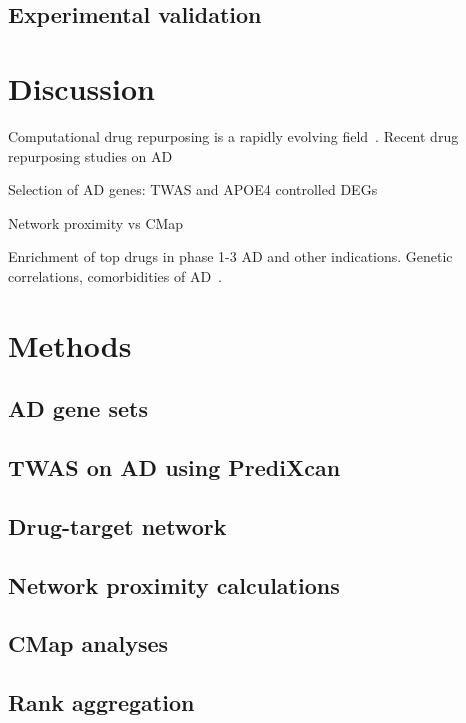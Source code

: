 \documentclass[letterpaper]{article}
\begin{document}
\subsection{Experimental validation}

\section{Discussion}

Computational drug repurposing is a rapidly evolving
field~\citep{Pushpakom2019}.  Recent drug repurposing studies on
AD~\citep{Taubes2021,Fang2021}

Selection of AD genes: TWAS and APOE4 controlled DEGs

Network proximity vs CMap

Enrichment of top drugs in phase 1-3 AD and other indications.  Genetic
correlations, comorbidities of AD~\citep{Consortium2018,Santiago2021}.

\section{Methods}

\subsection{AD gene sets}

\subsection{TWAS on AD using PrediXcan}

\subsection{Drug-target network}

\subsection{Network proximity calculations}

\subsection{CMap analyses}

\subsection{Rank aggregation}


\end{document}
